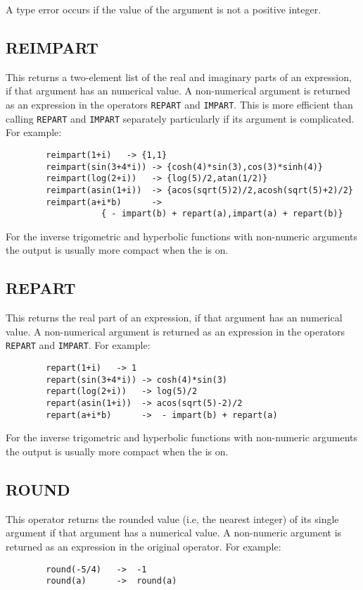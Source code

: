 A type error occurs if the value of the argument is not a positive integer.

\subsection{REIMPART}
\hypertarget{operator:REIMPART}{}
This returns a two-element list of the real and imaginary parts of an
expression, if that argument has an
numerical value.  A non-numerical argument is returned as an expression in
the operators \texttt{REPART} and \texttt{IMPART}.
This is more efficient than calling \texttt{REPART} and \texttt{IMPART}
separately particularly if its argument is complicated.
For example:
\begin{verbatim}
        reimpart(1+i)   -> {1,1}
        reimpart(sin(3+4*i)) -> {cosh(4)*sin(3),cos(3)*sinh(4)}
        reimpart(log(2+i))   -> {log(5)/2,atan(1/2)}
        reimpart(asin(1+i))  -> {acos(sqrt(5)2)/2,acosh(sqrt(5)+2)/2}
        reimpart(a+i*b)      ->
                   { - impart(b) + repart(a),impart(a) + repart(b)}
\end{verbatim}
For the inverse trigometric and hyperbolic functions with non-numeric arguments the output is usually more compact when the  is on.

\subsection{REPART}
\hypertarget{operator:REPART}{}
This returns the real part of an expression, if that argument has an
numerical value.  A non-numerical argument is returned as an expression in
the operators \texttt{REPART} and \texttt{IMPART}.
For example:
\begin{verbatim}
        repart(1+i)   -> 1
        repart(sin(3+4*i)) -> cosh(4)*sin(3)
        repart(log(2+i))   -> log(5)/2
        repart(asin(1+i))  -> acos(sqrt(5)-2)/2
        repart(a+i*b)      ->  - impart(b) + repart(a)
\end{verbatim}

For the inverse trigometric and hyperbolic functions with non-numeric arguments the output is usually more compact when the  is on.

\subsection{ROUND}
\hypertarget{operator:ROUND}{}
This operator returns the rounded value (i.e, the nearest integer) of its
single argument if that argument has a numerical value.  A non-numeric
argument is returned as an expression in the original operator.  For
example:
\begin{verbatim}
        round(-5/4)   ->  -1
        round(a)      ->  round(a)
\end{verbatim}

